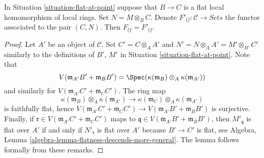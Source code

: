 \begin{lemma}
\label{lemma-flat-at-point-go-up}
In
Situation \ref{situation-flat-at-point}
suppose that $B \to C$ is a flat local homomorphism of local
rings. Set $N = M \otimes_B C$. Denote
$F'_{lf} : \mathcal{C} \to \textit{Sets}$ the functor associated
to the pair $(C, N)$. Then $F_{lf} = F'_{lf}$.
\end{lemma}

\begin{proof}
Let $A'$ be an object of $\mathcal{C}$. Set $C' = C \otimes_A A'$
and $N' = N \otimes_A A' = M' \otimes_{B'} C'$ similarly to the definitions
of $B'$, $M'$ in
Situation \ref{situation-flat-at-point}. Note that
$$
V(\mathfrak m_{A'}B' + \mathfrak m_B B')
=
\Spec( \kappa(\mathfrak m_B) \otimes_A \kappa(\mathfrak m_{A'}) )
$$
and similarly for $V(\mathfrak m_{A'}C' + \mathfrak m_C C')$.
The ring map
$$
\kappa(\mathfrak m_B) \otimes_A \kappa(\mathfrak m_{A'})
\longrightarrow
\kappa(\mathfrak m_C) \otimes_A \kappa(\mathfrak m_{A'})
$$
is faithfully flat, hence
$V(\mathfrak m_{A'}C' + \mathfrak m_C C') \to
V(\mathfrak m_{A'}B' + \mathfrak m_B B')$ is surjective.
Finally, if $\mathfrak r \in V(\mathfrak m_{A'}C' + \mathfrak m_C C')$
maps to $\mathfrak q \in V(\mathfrak m_{A'}B' + \mathfrak m_B B')$, then
$M'_{\mathfrak q}$ is flat over $A'$ if and only if
$N'_{\mathfrak r}$ is flat over $A'$ because $B' \to C'$ is flat, see
Algebra, Lemma \ref{algebra-lemma-flatness-descends-more-general}.
The lemma follows formally from these remarks.
\end{proof}

